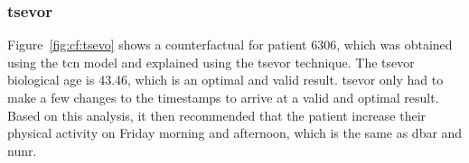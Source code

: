 \subsubsection{\gls{tsevor}}
Figure~\ref{fig:cf:tsevo} shows a counterfactual for patient $6306$, which was obtained using the \gls{tcn} model and explained using the \gls{tsevor} technique.
The \gls{tsevor} biological age is 43.46, which is an optimal and valid result. \gls{tsevor} only had to make a few changes to the timestamps to arrive at a valid and optimal result. Based on this analysis, it then recommended that the patient increase their physical activity on Friday morning and afternoon, which is the same as \gls{dbar} and \gls{nunr}.


